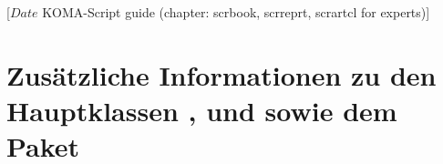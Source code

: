 %
%
%
%
%
%
%
%
% 
%
%
%
%

%
                 [$Date$
                  KOMA-Script guide (chapter: scrbook, scrreprt, scrartcl for
                  experts)]

\chapter[{Zusätzliche Informationen zu den Hauptklassen und 
  \Package{scrextend}}]{Zusätzliche
  Informationen zu den Hauptklassen 
  ,  und
   sowie dem 
  Paket }

